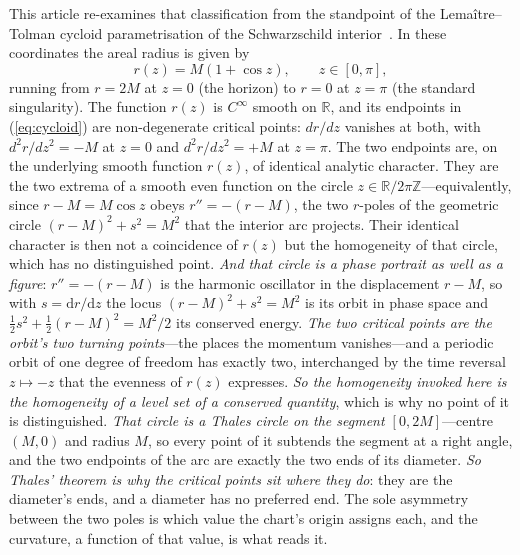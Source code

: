 \documentclass[11pt,a4paper]{article}
\theoremstyle{definition}
\newcommand{\dd}{\mathrm{d}}   %
\begin{document}
This article re-examines that classification from the standpoint of the Lemaître--Tolman cycloid parametrisation of the Schwarzschild interior~\cite{lemaitre1933,Tolman1934}. In these coordinates the areal radius is given by
\begin{equation}\label{eq:cycloid}
r(z) = M(1 + \cos z), \qquad z \in [0, \pi],
\end{equation}
running from $r=2M$ at $z=0$ (the horizon) to $r=0$ at $z=\pi$ (the standard singularity). The function $r(z)$ is $C^\infty$ smooth on $\mathbb{R}$, and its endpoints in (\ref{eq:cycloid}) are non-degenerate critical points: $dr/dz$ vanishes at both, with $d^2r/dz^2 = -M$ at $z=0$ and $d^2r/dz^2 = +M$ at $z=\pi$. The two endpoints are, on the underlying smooth function $r(z)$, of identical analytic character. They are the two extrema of a smooth even function on the circle $z \in \mathbb{R}/2\pi\mathbb{Z}$---equivalently, since $r-M=M\cos z$ obeys $r''=-(r-M)$, the two $r$-poles of the geometric circle $(r-M)^2+s^2=M^2$ that the interior arc projects. Their identical character is then not a coincidence of $r(z)$ but the homogeneity of that circle, which has no distinguished point. \emph{And that circle is a phase portrait as well as a figure}: $r''=-(r-M)$ is the harmonic oscillator in the displacement $r-M$, so with $s=\dd r/\dd z$ the locus $(r-M)^{2}+s^{2}=M^{2}$ is its orbit in phase space and $\tfrac12 s^{2}+\tfrac12(r-M)^{2}=M^{2}/2$ its conserved energy. \emph{The two critical points are the orbit's two turning points}---the places the momentum vanishes---and a periodic orbit of one degree of freedom has exactly two, interchanged by the time reversal $z\mapsto-z$ that the evenness of $r(z)$ expresses. \emph{So the homogeneity invoked here is the homogeneity of a level set of a conserved quantity}, which is why no point of it is distinguished. \emph{That circle is a Thales circle on the segment $[0,2M]$}---centre $(M,0)$ and radius $M$, so every point of it subtends the segment at a right angle, and the two endpoints of the arc are exactly the two ends of its diameter. \emph{So Thales' theorem is why the critical points sit where they do}: they are the diameter's ends, and a diameter has no preferred end. The sole asymmetry between the two poles is which value the chart's origin assigns each, and the curvature, a function of that value, is what reads it.
\end{document}
